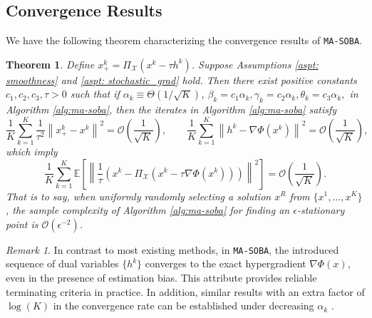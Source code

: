 \documentclass[10pt]{article}
\newtheorem{theorem}{Theorem}
\theoremstyle{remark}
\newtheorem*{remark}{Remark}
\newcommand{\cG}{\mathcal{G}}
\newcommand{\cO}{\mathcal{O}}
\newcommand{\cX}{\mathcal{X}}
\newcommand{\E}{\mathbb{E}}
\newcommand{\norm}[1]{\left\|#1\right\|}
\begin{document}
\subsection{Convergence Results}
We have the following theorem characterizing the convergence results of \texttt{MA-SOBA}.
\begin{thmbox}
\begin{theorem}\label{thm: soba_convergence}
    Define $x_+^k = \Pi_{\cX}(x^k - \tau h^k)$. Suppose Assumptions \ref{aspt: smoothness} and \ref{aspt: stochastic_grad} hold. Then there exist positive constants $c_1, c_2, c_3, \tau>0$ such that if $\alpha_k \equiv \Theta(1/\sqrt{K})$, $\beta_k = c_1\alpha_k, \gamma_k = c_2\alpha_k, \theta_k = c_3\alpha_k,$ in Algorithm \ref{alg:ma-soba}, then the iterates in Algorithm \ref{alg:ma-soba} satisfy
    \begin{equation}\label{eq: optimality_measure_thm}
        \frac{1}{K}\sum_{k=1}^{K}\frac{1}{\tau^2}\norm{x_+^k - x^k}^2 = \cO\left(\frac{1}{\sqrt{K}}\right),\qquad \frac{1}{K}\sum_{k=1}^{K}\norm{h^k - \nabla \Phi(x^k)}^2 = \cO\left(\frac{1}{\sqrt{K}}\right),
    \end{equation}
    which imply
    \[
        \frac{1}{K}\sum_{k=1}^{K}\E\left[\norm{\frac{1}{\tau} \left(x^k - \Pi_{\cX}(x^k - \tau \nabla \Phi(x^k))\right)}^2\right] = \cO\left(\frac{1}{\sqrt{K}}\right).
    \]
    That is to say, when uniformly randomly selecting a solution $x^R$ from $\{x^1, \dots, x^K\}$, the sample complexity of Algorithm \ref{alg:ma-soba} for finding an $\epsilon$-stationary point is $\mathcal{O}(\epsilon^{-2})$.
\end{theorem}
\end{thmbox}

\begin{remark}
    In contrast to most existing methods, in \texttt{MA-SOBA}, the introduced sequence of dual variables $\{h^k\}$ converges to the exact hypergradient $\nabla \Phi(x)$, even in the presence of estimation bias. This attribute provides reliable terminating criteria in practice. In addition, similar results with an extra factor of $\log(K)$ in the convergence rate can be established under decreasing $\alpha_k$ \cite{dagreou2022framework}. 
\end{remark}
\end{document}

